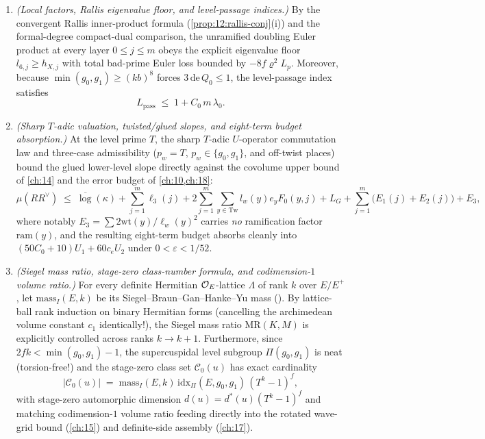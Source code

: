 \begin{theorem}
\begin{enumerate}[label=\textup{\textbf{Block~\Roman*.}}]
\item \emph{(Local factors, Rallis eigenvalue floor, and level-passage indices.)}
  By the convergent Rallis inner-product formula (\cref{prop:12:rallis-conj}(i)) and the formal-degree compact-dual comparison, the unramified doubling Euler product at every layer $0 \le j \le m$ obeys the explicit eigenvalue floor $l_{6, j} \ge h_{X, j}$ with total bad-prime Euler loss bounded by $-8 f \varrho^2 L_p$. Moreover, because $\min(g_0, g_1) \ge (k b)^8$ forces $3\,\mathrm{de}\,Q_0 \le 1$, the level-passage index satisfies
  \[
    L_{\mathrm{pass}} \;\le\; 1 + C_0\, m\, \lambda_0.
  \]

\item \emph{(Sharp $T$-adic valuation, twisted/glued slopes, and eight-term budget absorption.)}
  At the level prime $T$, the sharp $T$-adic $U$-operator commutation law and three-case admissibility ($p_w = T$, $p_w \in \{g_0, g_1\}$, and off-twist places) bound the glued lower-level slope directly against the covolume upper bound of \cref{ch:14} and the error budget of \cref{ch:10,ch:18}:
  \begin{equation}
  \label{eq:12:indef-boundsmu}
    \mu(R R^\vee) \;\le\; \overline{\log}(\kappa) + \sum_{j=1}^m \ell_3(j) + 2\sum_{j=1}^m\sum_{y \in \mathrm{Tw}} l_w(y) e_y F_0(y, j)
    + L_G + \sum_{j=1}^m \bigl(E_1(j) + E_2(j)\bigr) + E_3,
  \end{equation}
  where notably $E_3 = \sum 2\mathrm{wt}(y)/\ell_w(y)^2$ carries \emph{no} ramification factor $\mathrm{ram}(y)$, and the resulting eight-term budget absorbs cleanly into $(50 C_0 + 10) U_1 + 60 c_e U_2$ under $0 < \varepsilon < 1/52$.

\item \emph{(Siegel mass ratio, stage-zero class-number formula, and codimension-$1$ volume ratio.)}
  For every definite Hermitian $\mathcal{O}_E$-lattice $\Lambda$ of rank $k$ over $E/E^+$, let $\mathrm{mass}_I(E, k)$ be its Siegel--Braun--Gan--Hanke--Yu mass (). By lattice-ball rank induction on binary Hermitian forms (cancelling the archimedean volume constant $c_1$ identically!), the Siegel mass ratio $\mathrm{MR}(K, M)$ is explicitly controlled across ranks $k \to k + 1$. Furthermore, since $2 f k < \min(g_0, g_1) - 1$, the supercuspidal level subgroup $\Pi(g_0, g_1)$ is neat (torsion-free!) and the stage-zero class set $\mathcal{C}_0(u)$ has exact cardinality
  \begin{equation}
  \label{eq:12:class-num}
    |\mathcal{C}_0(u)| \;=\; \mathrm{mass}_I(E, k)\,\mathrm{idx}_\Pi(E, g_0, g_1)\,(T^k - 1)^f,
  \end{equation}
  with stage-zero automorphic dimension $d(u) = d^*(u)(T^k - 1)^f$ and matching codimension-$1$ volume ratio feeding directly into the rotated wave-grid bound (\cref{ch:15}) and definite-side assembly (\cref{ch:17}).
\end{enumerate}
\end{theorem}
